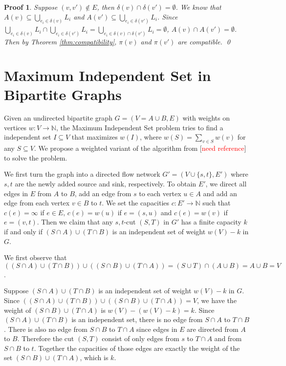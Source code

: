 \documentclass{bmcart}
\newcommand{\note}[1]{\textcolor{red}{#1}}
\theoremstyle{mystyle}
\theoremstyle{proofstyle}
\newtheorem*{proof2}{Proof}
\newenvironment{proofnospace}{\begin{proof2}}{\qed \end{proof2}}
\begin{document}
\begin{proofnospace}
  Suppose $(v,v') \notin E$, then $\delta(v) \cap \delta(v') = \emptyset$. We know that $A(v) \subseteq \bigcup_{e_i \in \delta(v)}L_i$ and $A(v') \subseteq \bigcup_{e_i \in \delta(v')}L_i$. Since $\bigcup_{e_i \in \delta(v)}L_i \cap \bigcup_{e_i\in\delta(v')} L_i = \bigcup_{e_i \in \delta(v) \cap \delta(v')} L_i = \emptyset$, $A(v) \cap A(v') = \emptyset$. Then by Theorem \ref{thm:compatibility}, $\pi(v)$ and $\pi(v')$ are compatible.  
\end{proofnospace}

\section{Maximum Independent Set in Bipartite Graphs}
Given an undirected bipartite graph $G= (V = A \cup B, E)$ with weights on vertices $w: V \to \mathbb{N}$, the Maximum Independent Set problem tries to find a independent set $I \subseteq V$ that maximizes $w(I)$, where $w(S) = \sum_{v\in S}w(v)$ for any $S \subseteq V$. We propose a weighted variant of the algorithm from [\note{need reference}] to solve the problem. \smallskip

We first turn the graph into a directed flow network $G' = (V \cup \{s,t\}, E')$ where $s, t$ are the newly added source and sink, respectively. To obtain $E'$, we direct all edges in $E$ from $A$ to $B$, add an edge from $s$ to each vertex $u \in A$ and add an edge from each vertex $v \in B$ to $t$. We set the capacities $c: E' \to \mathbb{N}$ such that $c(e) = \infty$ if $e \in E$, $c(e) = w(u)$ if $e = (s,u)$ and $c(e) = w(v)$ if $e = (v,t)$. Then we claim that any $s,t$-cut $(S,T)$ in $G'$ has a finite capacity $k$ if and only if $(S\cap A) \cup (T \cap B)$ is an independent set of weight $w(V) - k$ in $G$. \smallskip

We first observe that $((S \cap A) \cup (T\cap B)) \cup ((S \cap B) \cup (T \cap A)) = (S\cup T) \cap (A \cup B) = A \cup B = V$. \smallskip

Suppose $(S \cap A) \cup (T\cap B)$ is an independent set of weight $w(V) - k$ in $G$. Since $((S \cap A) \cup (T\cap B)) \cup ((S \cap B) \cup (T \cap A)) = V$, we have the weight of $(S \cap B) \cup (T \cap A)$ is $w(V)-(w(V)-k) = k$. Since $(S \cap A) \cup (T\cap B)$ is an independent set, there is no edge from $S \cap A$ to $T\cap B$. There is also no edge from $S \cap B$ to $T \cap A$ since edges in $E$ are directed from $A$ to $B$. Therefore the cut $(S,T)$ consist of only edges from $s$ to $T \cap A$ and from $S \cap B$ to $t$. Together the capacities of those edges are exactly the weight of the set $(S \cap B) \cup (T \cap A)$, which is $k$. \smallskip
\end{document}
